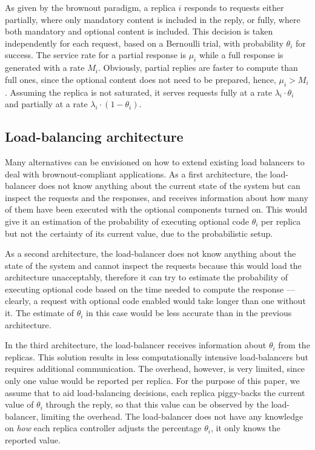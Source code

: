 As given by the brownout paradigm, a replica $i$ responds to requests
either partially, where only mandatory content is included in the
reply, or fully, where both mandatory and optional content is
included. This decision is taken independently for each request, based
on a Bernoulli trial, with probability $\theta_i$ for success.  The
service rate for a partial response is $\mu_i$ while a full response
is generated with a rate $M_i$. Obviously, partial replies are faster
to compute than full ones, since the optional content does not need to
be prepared, hence, $\mu_i > M_i$. Assuming the replica is not
saturated, it serves requests fully at a rate $\lambda_i \cdot
\theta_i$ and partially at a rate $\lambda_i \cdot (1-\theta_i)$.

\subsection{Load-balancing architecture}
Many alternatives can be envisioned on how to extend existing load
balancers to deal with brownout-compliant applications. As a first
architecture, the load-balancer does not know anything about the
current state of the system but can inspect the requests and the
responses, and receives information about how many of them have been
executed with the optional components turned on. This would give it an
estimation of the probability of executing optional code $\theta_i$
per replica but not the certainty of its current value, due to the
probabilistic setup.

As a second architecture, the load-balancer does not know anything
about the state of the system and cannot inspect the requests because
this would load the architecture unacceptably, therefore it can try to
estimate the probability of executing optional code based on the time
needed to compute the response --- clearly, a request with optional
code enabled would take longer than one without it. The estimate of
$\theta_i$ in this case would be less accurate than in the previous
architecture.

In the third architecture, the load-balancer receives information
about $\theta_i$ from the replicas. This solution results in less
computationally intensive load-balancers but requires additional
communication. The overhead, however, is very limited, since only one
value would be reported per replica. For the purpose of this paper, we
assume that to aid load-balancing decisions, each replica piggy-backs
the current value of $\theta_i$ through the reply, so that this value
can be observed by the load-balancer, limiting the overhead. The
load-balancer does not have any knowledge on \emph{how} each replica
controller adjusts the percentage $\theta_i$, it only knows the
reported value.

